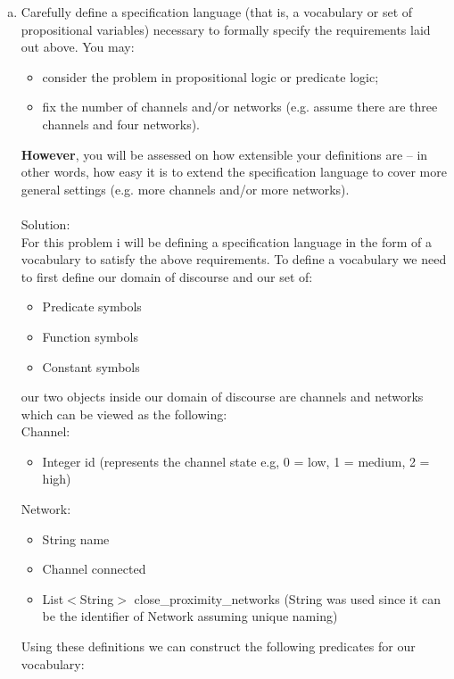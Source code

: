 \documentclass{article}
\newcommand*\moveToRight[1]{\hspace*{0em plus 1fill}\makebox{(#1)}}
\begin{document}
\begin{enumerate}[(a)]
        \item Carefully define a specification language (that is, a vocabulary or set of propositional variables) necessary to formally specify the requirements laid out above. You may:
        \begin{itemize}
            \item consider the problem in propositional logic or predicate logic;
            \item fix the number of channels and/or networks (e.g. assume there are three channels and four networks).
        \end{itemize}
        \textbf{However}, you will be assessed on how extensible your definitions are – in other words, how easy it is to extend the specification language to cover more general settings (e.g. more channels and/or more networks). \moveToRight{4 marks}\\\\
        Solution: \\
        For this problem i will be defining a specification language in the form of a vocabulary to satisfy the above requirements. To define a vocabulary we need to first define our domain of discourse and our set of: 
        \begin{itemize}
            \item Predicate symbols 
            \item Function symbols
            \item Constant symbols
        \end{itemize}
        our two objects inside our domain of discourse are channels and networks which can be viewed as the following:\\
        Channel:
        \begin{itemize}
            \item Integer id (represents the channel state e.g, 0 = low, 1 = medium, 2 = high)  
        \end{itemize}
        Network:
        \begin{itemize}
            \item String name
            \item Channel connected
            \item List$<$String$>$ close\_proximity\_networks (String was used since it can be the identifier of Network assuming unique naming)
        \end{itemize}
        Using these definitions we can construct the following predicates for our vocabulary:
        

\end{enumerate}
\end{document}
